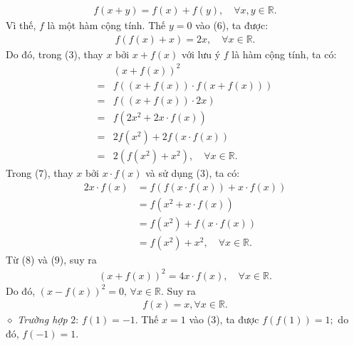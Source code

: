 \begin{multicols}{2}
	\begin{align*}
		f\left( {x + y} \right) = f\left( x \right) + f\left( y \right), \quad\forall x,y \in \mathbb{R}.
	\end{align*}
	Vì thế, $f$  là một hàm cộng tính.
	\vskip 0.05cm
	Thế $y = 0$ vào ($6$), ta được:
	\begin{align*}
		f\left( {f\left( x \right) + x} \right) = 2x, \quad\forall x \in \mathbb{R}. \tag{$7$}
	\end{align*}
	Do đó, trong ($3$), thay $x$ bởi $x + f(x)$  với lưu ý $f$  là hàm cộng tính, ta có:
	\begin{align*}
			&{\left( {x + f\left( x \right)} \right)^2} \\
			= &f\left( {\left( {x + f\left( x \right)} \right) \cdot f\left( {x + f\left( x \right)} \right)} \right) \\
			= &f\left( {\left( {x + f\left( x \right)} \right) \cdot 2x} \right)\\
			= &f\left(\! {2{x^2} \!+\! 2x \!\cdot\! f\left( x \right)} \!\right)\\ =& 2f\!\left(\! {{x^2}} \right) \!+\! 2f\left( {x \!\cdot\! f\left( x \right)} \right)\\
			= &2\left( {f\left( {{x^2}} \right) + {x^2}} \right),\quad \forall x\in \mathbb{R}. \tag{$8$}
	\end{align*}
	Trong ($7$), thay $x$ bởi $x \cdot f(x)$  và sử dụng ($3$), ta có:
	\begin{align*}
		2x \cdot f\left( x \right) &= f\left( {f\left( {x \cdot f\left( x \right)} \right) + x \cdot f\left( x \right)} \right) \\[-0.4ex]
		&= f\left( {{x^2} + x \cdot f\left( x \right)} \right)\\[-0.4ex]
		&= f\left( {{x^2}} \right) + f\left( {x \cdot f\left( x \right)} \right) \\[-0.4ex]
		&= f\left( {{x^2}} \right) + {x^2}, \quad\forall x\in \mathbb{R}. \tag{$9$}
	\end{align*}
	Từ ($8$) và ($9$), suy ra
	\begin{align*}
		{\left( {x + f\left( x \right)} \right)^2} = 4x \cdot f\left( x \right),\quad\forall x \in \mathbb{R}.
	\end{align*}
	Do đó,  ${\left( {x - f\left( x \right)} \right)^2} = 0,\,\forall x\in \mathbb{R}$. Suy ra  
	\begin{align*}
		f(x) = x, \forall x \in \mathbb{R}.
	\end{align*}
	$\diamond$ \textit{Trường hợp} $2$: $f(1) = -1$.
	\vskip 0.05cm  
	Thế $x = 1$ vào ($3$), ta được $f\left( {f\left( 1 \right)} \right) = 1;$  do đó, $f(-1) = 1$.

\end{multicols}

